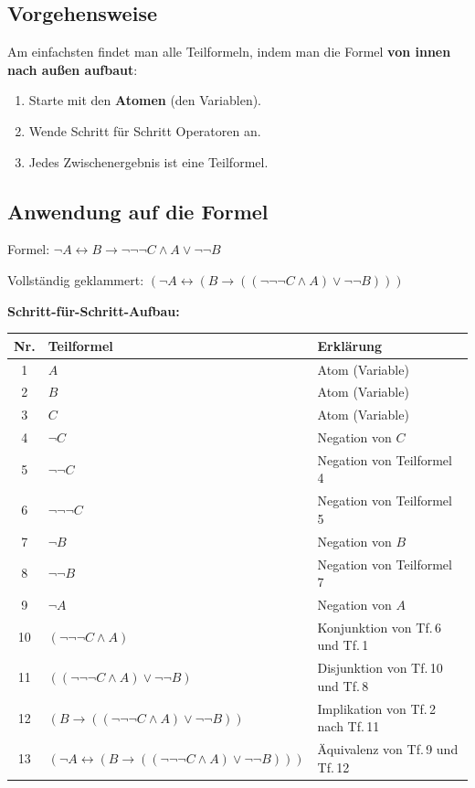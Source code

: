 \documentclass[a4paper,12pt]{article}
\begin{document}
\subsection{Vorgehensweise}

Am einfachsten findet man alle Teilformeln, indem man die Formel
\textbf{von innen nach au\ss en aufbaut}:

\begin{enumerate}
\item Starte mit den \textbf{Atomen} (den Variablen).
\item Wende Schritt f\"ur Schritt Operatoren an.
\item Jedes Zwischenergebnis ist eine Teilformel.
\end{enumerate}

\subsection{Anwendung auf die Formel}

Formel: $\neg A \leftrightarrow B \to \neg\neg\neg C \wedge A \vee \neg\neg B$

\medskip
Vollst\"andig geklammert:
$(\neg A \leftrightarrow (B \to ((\neg\neg\neg C \wedge A) \vee \neg\neg B)))$

\bigskip
\textbf{Schritt-f\"ur-Schritt-Aufbau:}

\begin{center}
\renewcommand{\arraystretch}{1.4}
\begin{tabular}{clp{7.5cm}}
\toprule
\textbf{Nr.} & \textbf{Teilformel} & \textbf{Erkl\"arung} \\
\midrule
1  & $A$   & Atom (Variable) \\
2  & $B$   & Atom (Variable) \\
3  & $C$   & Atom (Variable) \\
\midrule
4  & $\neg C$         & Negation von $C$ \\
5  & $\neg\neg C$     & Negation von Teilformel 4 \\
6  & $\neg\neg\neg C$ & Negation von Teilformel 5 \\
\midrule
7  & $\neg B$         & Negation von $B$ \\
8  & $\neg\neg B$     & Negation von Teilformel 7 \\
\midrule
9  & $\neg A$         & Negation von $A$ \\
\midrule
10 & $(\neg\neg\neg C \wedge A)$
   & Konjunktion von Tf.\,6 und Tf.\,1 \\
11 & $((\neg\neg\neg C \wedge A) \vee \neg\neg B)$
   & Disjunktion von Tf.\,10 und Tf.\,8 \\
12 & $(B \to ((\neg\neg\neg C \wedge A) \vee \neg\neg B))$
   & Implikation von Tf.\,2 nach Tf.\,11 \\
13 & $(\neg A \leftrightarrow (B \to ((\neg\neg\neg C \wedge A) \vee \neg\neg B)))$
   & \"Aquivalenz von Tf.\,9 und Tf.\,12 \\
\bottomrule
\end{tabular}
\end{center}
\end{document}
